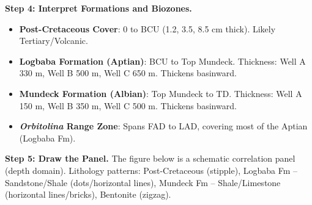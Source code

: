 \documentclass[11pt]{article}
\begin{document}
\begin{exoresolu}
\noindent\textbf{Step 4: Interpret Formations and Biozones.}
\begin{itemize}
\item \textbf{Post-Cretaceous Cover}: 0 to BCU (1.2, 3.5, 8.5 cm thick). Likely Tertiary/Volcanic.
\item \textbf{Logbaba Formation (Aptian)}: BCU to Top Mundeck. Thickness: Well A 330 m, Well B 500 m, Well C 650 m. Thickens basinward.
\item \textbf{Mundeck Formation (Albian)}: Top Mundeck to TD. Thickness: Well A 150 m, Well B 350 m, Well C 500 m. Thickens basinward.
\item \textbf{\emph{Orbitolina} Range Zone}: Spans FAD to LAD, covering most of the Aptian (Logbaba Fm).
\end{itemize}

\noindent\textbf{Step 5: Draw the Panel.}
The figure below is a schematic correlation panel (depth domain). Lithology patterns: Post-Cretaceous (stipple), Logbaba Fm -- Sandstone/Shale (dots/horizontal lines), Mundeck Fm -- Shale/Limestone (horizontal lines/bricks), Bentonite (zigzag).

\begin{popfigure}
\end{popfigure}
\end{exoresolu}
\end{document}
